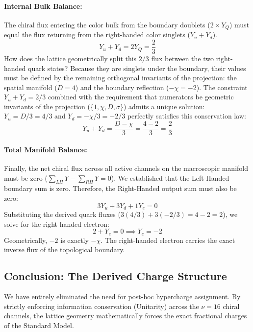 \paragraph{Internal Bulk Balance:}
The chiral flux entering the color bulk from the boundary doublets ($2 \times Y_Q$) must equal the flux returning from the right-handed color singlets ($Y_u + Y_d$).
\begin{equation}
Y_u + Y_d = 2 Y_Q = \frac{2}{3}
\end{equation}
How does the lattice geometrically split this $2/3$ flux between the two right-handed quark states? Because they are singlets under the boundary, their values must be defined by the remaining orthogonal invariants of the projection: the spatial manifold ($D=4$) and the boundary reflection ($-\chi = -2$). The constraint $Y_u + Y_d = 2/3$ combined with the requirement that numerators be geometric invariants of the projection ($\{1, \chi, D, \sigma\}$) admits a unique solution: $Y_u = D/3 = 4/3$ and $Y_d = -\chi/3 = -2/3$ perfectly satisfies this conservation law:
\begin{equation}
Y_u + Y_d = \frac{D - \chi}{3} = \frac{4 - 2}{3} = \frac{2}{3}
\end{equation}

\paragraph{Total Manifold Balance:}
Finally, the net chiral flux across all active channels on the macroscopic manifold must be zero ($\sum_{LH} Y - \sum_{RH} Y = 0$). We established that the Left-Handed boundary sum is zero. Therefore, the Right-Handed output sum must also be zero:
\begin{equation}
3 Y_u + 3 Y_d + 1 Y_e = 0
\end{equation}
Substituting the derived quark fluxes ($3(4/3) + 3(-2/3) = 4 - 2 = 2$), we solve for the right-handed electron:
\begin{equation}
2 + Y_e = 0 \implies Y_e = -2
\end{equation}
Geometrically, $-2$ is exactly $-\chi$. The right-handed electron carries the exact inverse flux of the topological boundary.

\subsection{Conclusion: The Derived Charge Structure}
We have entirely eliminated the need for post-hoc hypercharge assignment. By strictly enforcing information conservation (Unitarity) across the $\nu=16$ chiral channels, the lattice geometry mathematically forces the exact fractional charges of the Standard Model. 

